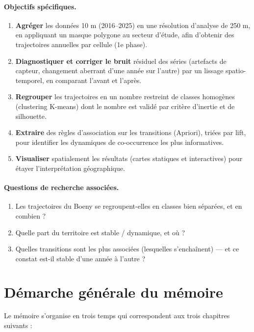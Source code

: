 \paragraph{Objectifs spécifiques.}

\begin{enumerate}
  \item \textbf{Agréger} les données 10 m (2016--2025) en une résolution d'analyse
        de 250 m, en appliquant un masque polygone au secteur d'étude, afin
        d'obtenir des trajectoires annuelles par cellule (1e phase).
  \item \textbf{Diagnostiquer et corriger le bruit} résiduel des séries
        (artefacts de capteur, changement aberrant d'une année sur l'autre) par
        un lissage spatio-temporel, en comparant l'avant et l'après.
  \item \textbf{Regrouper} les trajectoires en un nombre restreint de classes
        homogènes (clustering K-means) dont le nombre est validé par critère
        d'inertie et de silhouette.
  \item \textbf{Extraire} des règles d'association sur les transitions
        (Apriori), triées par lift, pour identifier les dynamiques de
        co-occurrence les plus informatives.
  \item \textbf{Visualiser} spatialement les résultats (cartes statiques et
        interactives) pour étayer l'interprétation géographique.
\end{enumerate}

\paragraph{Questions de recherche associées.}
\begin{enumerate}
  \item Les trajectoires du Boeny se regroupent-elles en classes bien séparées,
        et en combien ?
  \item Quelle part du territoire est stable / dynamique, et où ?
  \item Quelles transitions sont les plus associées (lesquelles s'enchaînent) —
        et ce constat est-il stable d'une année à l'autre ?
\end{enumerate}

\section{Démarche générale du mémoire}

Le mémoire s'organise en trois temps qui correspondent aux trois chapitres
suivants :

